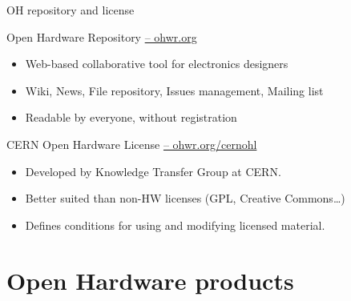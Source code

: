 \documentclass[compress,red]{beamer}
\begin{document}
\begin{frame}{OH repository and license}

  \begin{block}{Open Hardware Repository \href{http://ohwr.org}{-- ohwr.org}}
    \begin{itemize}
    \item Web-based collaborative tool for electronics designers
    \item Wiki, News, File repository, Issues management, Mailing list
    \item Readable by everyone, without registration
   \end{itemize}
  \end{block}

  \begin{block}{CERN Open Hardware License \href{http://ohwr.org/cernohl}{-- ohwr.org/cernohl}}
    \begin{itemize}
    \item Developed by Knowledge Transfer Group at CERN.
    \item Better suited than non-HW licenses (GPL, Creative Commons\dots)
    \item Defines conditions for using and modifying licensed material.
   \end{itemize}
  \end{block}


\end{frame}




\section[OH products]{Open Hardware products}
\end{document}
